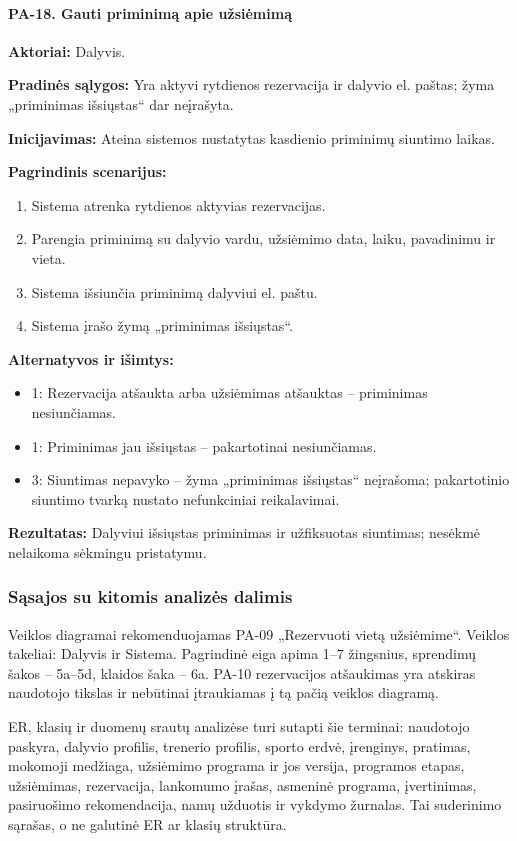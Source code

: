 \paragraph{PA-18. Gauti priminimą apie užsiėmimą}\mbox{}\par
\textbf{Aktoriai:} Dalyvis.\par
\textbf{Pradinės sąlygos:} Yra aktyvi rytdienos rezervacija ir dalyvio el. paštas; žyma „priminimas išsiųstas“ dar neįrašyta.\par
\textbf{Inicijavimas:} Ateina sistemos nustatytas kasdienio priminimų siuntimo laikas.\par
\textbf{Pagrindinis scenarijus:}
\begin{enumerate}
\item Sistema atrenka rytdienos aktyvias rezervacijas.
\item Parengia priminimą su dalyvio vardu, užsiėmimo data, laiku, pavadinimu ir vieta.
\item Sistema išsiunčia priminimą dalyviui el. paštu.
\item Sistema įrašo žymą „priminimas išsiųstas“.
\end{enumerate}
\textbf{Alternatyvos ir išimtys:}
\begin{itemize}
\item 1: Rezervacija atšaukta arba užsiėmimas atšauktas -- priminimas nesiunčiamas.
\item 1: Priminimas jau išsiųstas -- pakartotinai nesiunčiamas.
\item 3: Siuntimas nepavyko -- žyma „priminimas išsiųstas“ neįrašoma; pakartotinio siuntimo tvarką nustato nefunkciniai reikalavimai.
\end{itemize}
\textbf{Rezultatas:} Dalyviui išsiųstas priminimas ir užfiksuotas siuntimas; nesėkmė nelaikoma sėkmingu pristatymu.\par

\subsubsection{Sąsajos su kitomis analizės dalimis}
Veiklos diagramai rekomenduojamas PA-09 „Rezervuoti vietą užsiėmime“. Veiklos takeliai: Dalyvis ir Sistema. Pagrindinė eiga apima 1--7 žingsnius, sprendimų šakos -- 5a--5d, klaidos šaka -- 6a. PA-10 rezervacijos atšaukimas yra atskiras naudotojo tikslas ir nebūtinai įtraukiamas į tą pačią veiklos diagramą.

ER, klasių ir duomenų srautų analizėse turi sutapti šie terminai: naudotojo paskyra, dalyvio profilis, trenerio profilis, sporto erdvė, įrenginys, pratimas, mokomoji medžiaga, užsiėmimo programa ir jos versija, programos etapas, užsiėmimas, rezervacija, lankomumo įrašas, asmeninė programa, įvertinimas, pasiruošimo rekomendacija, namų užduotis ir vykdymo žurnalas. Tai suderinimo sąrašas, o ne galutinė ER ar klasių struktūra.


